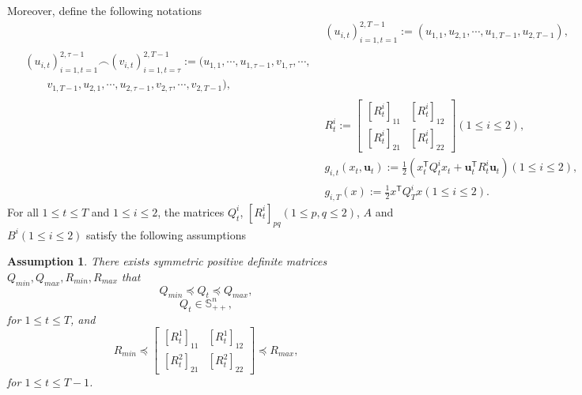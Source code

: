 \documentclass{article}
\newcommand{\transpose}{\mathsf{T}}
\newtheorem{assumption}{Assumption}
\begin{document}
Moreover, define the following notations
\begin{align}
    &(u_{i,t})_{i=1,t=1}^{2,T-1} := (u_{1,1},u_{2,1},\cdots, u_{1,T-1},u_{2,T-1}),\\
    \begin{split}
         &(u_{i,t})_{i=1,t=1}^{2,\tau-1} \frown (v_{i,t})_{i=1,t=\tau}^{2,T-1}:=(u_{1,1},\cdots,u_{1,\tau-1},v_{1,\tau},\cdots,\\
    &\qquad v_{1,T-1},u_{2,1},\cdots,u_{2,\tau-1},v_{2,\tau},\cdots,v_{2,T-1} ),
    \end{split}
   \\ 
   & R_{t}^{i} := 
   \begin{bmatrix}
       [R_{t}^{i}]_{11} & [R_{t}^{i}]_{12}\\
       [R_{t}^{i}]_{21} & [R_{t}^{i}]_{22}
   \end{bmatrix}(1\leq i \leq 2),\\
    &g_{i,t}(x_{t}, \mathbf{u}_{t}) := \frac{1}{2}(x_{t}^{\mathsf{T}}Q_{t}^{i}x_{t} + 
    \mathbf{u}_{t}^{\transpose}R_{t}^{i}\mathbf{u}_{t})(1\leq i \leq 2),\\
    &g_{i,T}(x) := \frac{1}{2} x^{\mathsf{T}}Q_{T}^{i}x(1\leq i \leq 2).
\end{align}
For all $1 \leq t \leq T$ and $1\leq i\leq 2$, the matrices $Q_{t}^{i}$, $[R_{t}^{i}]_{pq}(1\leq p,q \leq 2)$, $A$ and $B^{i}(1\leq i \leq 2)$ satisfy the following assumptions
\begin{assumption}\label{assumption:bounds}
    There exists symmetric positive definite matrices $Q_{min}, Q_{max}, R_{min}, R_{max}$ that
    \begin{equation}
        Q_{min} \preceq Q_{t} \preceq Q_{max},
    \end{equation}
    \begin{equation}
        Q_{t} \in \mathbb{S}^{n}_{++},
    \end{equation}
    for $1\leq t \leq T$, and
    \begin{equation}\label{eq:positiveR}
        R_{min} \preceq 
        \begin{bmatrix}
            [R_{t}^{1}]_{11} & [R_{t}^{1}]_{12}\\
            [R_{t}^{2}]_{21} & [R_{t}^{2}]_{22}
        \end{bmatrix}
        \preceq R_{max},
    \end{equation}
    for $1 \leq t \leq T-1$.
\end{assumption}
\end{document}
